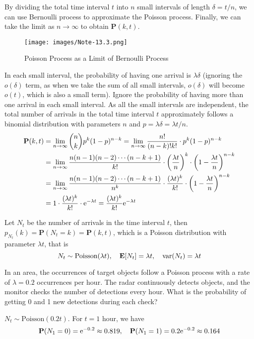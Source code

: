 \documentclass[device=normal, lang=en]{elegantbook}
\numberwithin{equation}{section}
\begin{document}
By dividing the total time interval $t$ into $n$ small intervals of length $\delta = t/n$, we can use Bernoulli process to approximate the Poisson process. Finally, we can take the limit as $n \to \infty$ to obtain $\mathbf{P}(k, t)$.
\begin{figure}[H]
    \centering
    \texttt{[image: images/Note-13.3.png]}
    \caption{Poisson Process as a Limit of Bernoulli Process}
\end{figure}

In each small interval, the probability of having one arrival is $\lambda \delta$ (ignoring the $o(\delta)$ term, as when we take the sum of all small intervals, $o(\delta)$ will become $o(t)$, which is also a small term). Ignore the probability of having more than one arrival in each small interval.
As all the small intervals are independent, the total number of arrivals in the total time interval $t$ approximately follows a binomial distribution with parameters $n$ and $p = \lambda \delta = \lambda t/n$. 
\begin{equation}
\begin{aligned}
    \mathbf{P}(k, t) &= \lim_{n \to \infty} \binom{n}{k} p^k (1-p)^{n-k} = \lim_{n \to \infty} \frac{n!}{(n-k)! k!} \cdot p^k (1-p)^{n-k} \\
    &= \lim_{n \to \infty} \frac{n(n-1)(n-2)\cdots(n-k+1)}{k!} \cdot \qty(\frac{\lambda t}{n})^k \cdot \qty(1 - \frac{\lambda t}{n})^{n-k} \\
    &= \lim_{n \to \infty} \frac{n(n-1)(n-2)\cdots(n-k+1)}{n^k} \cdot \frac{(\lambda t)^k}{k!} \cdot \qty(1 - \frac{\lambda t}{n})^{n-k} \\\
    &= 1 \cdot \frac{(\lambda t)^k}{k!} \cdot \mathrm{e}^{-\lambda t} = \frac{(\lambda t)^k}{k!} \mathrm{e}^{-\lambda t}
\end{aligned}
\end{equation}

Let $N_t$ be the number of arrivals in the time interval $t$, then $p_{N_t}(k) = \mathbf{P}(N_t = k) = \mathbf{P}(k, t)$, which is a Poisson distribution with parameter $\lambda t$, that is
\begin{equation}
    N_t \sim \text{Poisson}(\lambda t), \quad \mathbf{E}[N_t] = \lambda t, \quad \mathrm{var}(N_t) = \lambda t
\end{equation}
\begin{example}
    In an area, the occurrences of target objects follow a Poisson process with a rate of $\lambda = 0.2$ occurrences per hour. The radar continuously detects objects, and the monitor checks the number of detections every hour. What is the probability of getting 0 and 1 new detections during each check?
\end{example}
\begin{solution}
    $N_t \sim \text{Poisson}(0.2t)$. For $t = 1$ hour, we have
    \begin{equation}
        \mathbf{P}(N_1 = 0) = \mathrm{e}^{-0.2} \approx 0.819, \quad \mathbf{P}(N_1 = 1) = 0.2 \mathrm{e}^{-0.2} \approx 0.164
    \end{equation}
\end{solution}
\end{document}
